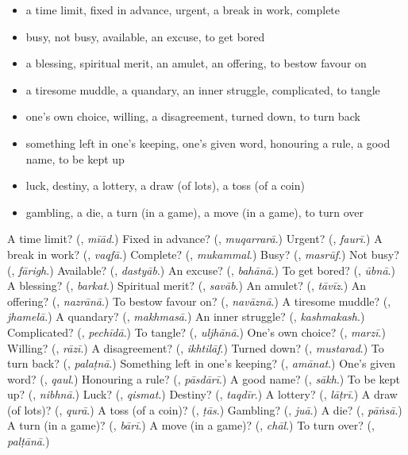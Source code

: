 \begin{itemize}
\raggedright
  \item a time limit, fixed in advance, urgent, a break in work, complete
  \item busy, not busy, available, an excuse, to get bored
  \item a blessing, spiritual merit, an amulet, an offering, to bestow favour on
  \item a tiresome muddle, a quandary, an inner struggle, complicated, to tangle
  \item one's own choice, willing, a disagreement, turned down, to turn back
  \item something left in one's keeping, one's given word, honouring a rule, a good name, to be kept up
  \item luck, destiny, a lottery, a draw (of lots), a toss (of a coin)
  \item gambling, a die, a turn (in a game), a move (in a game), to turn over
\end{itemize}

\begin{tcolorbox}[breakable,colback=teal!4,colframe=teal!35!black,title={Before you move on}]
A time limit? (\textbf{}, \emph{mīād}.) Fixed in advance? (\textbf{}, \emph{muqarrarā}.) Urgent? (\textbf{}, \emph{faurī}.) A break in work? (\textbf{}, \emph{vaqfā}.) Complete? (\textbf{}, \emph{mukammal}.) Busy? (\textbf{}, \emph{masrūf}.) Not busy? (\textbf{}, \emph{fārigh}.) Available? (\textbf{}, \emph{dastyāb}.) An excuse? (\textbf{}, \emph{bahānā}.) To get bored? (\textbf{}, \emph{ūbnā}.) A blessing? (\textbf{}, \emph{barkat}.) Spiritual merit? (\textbf{}, \emph{savāb}.) An amulet? (\textbf{}, \emph{tāvīz}.) An offering? (\textbf{}, \emph{nazrānā}.) To bestow favour on? (\textbf{}, \emph{navāznā}.) A tiresome muddle? (\textbf{}, \emph{jhamelā}.) A quandary? (\textbf{}, \emph{makhmasā}.) An inner struggle? (\textbf{}, \emph{kashmakash}.) Complicated? (\textbf{}, \emph{pechīdā}.) To tangle? (\textbf{}, \emph{uljhānā}.) One's own choice? (\textbf{}, \emph{marzī}.) Willing? (\textbf{}, \emph{rāzī}.) A disagreement? (\textbf{}, \emph{ikhtilāf}.) Turned down? (\textbf{}, \emph{mustarad}.) To turn back? (\textbf{}, \emph{palaṭnā}.) Something left in one's keeping? (\textbf{}, \emph{amānat}.) One's given word? (\textbf{}, \emph{qaul}.) Honouring a rule? (\textbf{}, \emph{pāsdārī}.) A good name? (\textbf{}, \emph{sākh}.) To be kept up? (\textbf{}, \emph{nibhnā}.) Luck? (\textbf{}, \emph{qismat}.) Destiny? (\textbf{}, \emph{taqdīr}.) A lottery? (\textbf{}, \emph{lāṭrī}.) A draw (of lots)? (\textbf{}, \emph{qurā}.) A toss (of a coin)? (\textbf{}, \emph{ṭās}.) Gambling? (\textbf{}, \emph{juā}.) A die? (\textbf{}, \emph{pāṅsā}.) A turn (in a game)? (\textbf{}, \emph{bārī}.) A move (in a game)? (\textbf{}, \emph{chāl}.) To turn over? (\textbf{}, \emph{palṭānā}.)
\end{tcolorbox}
